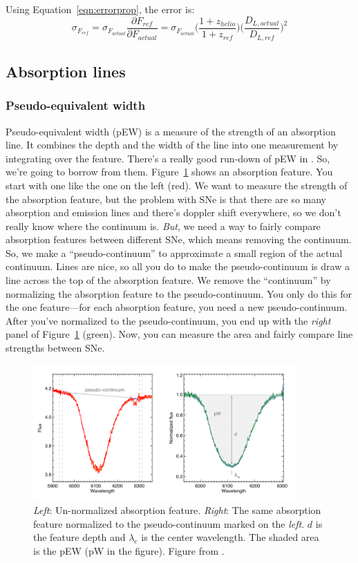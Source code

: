 Using Equation~\ref{eqn:errorprop}, the error is:
\begin{equation}
    \sigma_{F_{ref}} = \sigma_{F_{actual}}\frac{\partial F_{ref}}{\partial F_{actual}} = \sigma_{F_{actual}}\Big( \frac{1 + z_{helio}}{1+z_{ref}} \Big) \Big( \frac{D_{L, actual}}{D_{L, ref}} \Big)^{2}
\end{equation}

\subsection{Absorption lines}
\subsubsection{Pseudo-equivalent width}
Pseudo-equivalent width (pEW) is a measure of the strength of an absorption line. It combines the depth and the width of the line into one measurement by integrating over the feature. There's a really good run-down of pEW in \cite{Galbany2015}. So, we're going to borrow from them. Figure~\ref{fig:pew} shows an absorption feature. You start with one like the one on the left (red). We want to measure the strength of the absorption feature, but the problem with SNe is that there are so many absorption and emission lines and there's doppler shift everywhere, so we don't really know where the continuum is. \textit{But}, we need a way to fairly compare absorption features between different SNe, which means removing the continuum. So, we make a ``pseudo-continuum'' to approximate a small region of the actual continuum. Lines are nice, so all you do to make the pseudo-continuum is draw a line across the top of the absorption feature. We remove the ``continuum'' by normalizing the absorption feature to the pseudo-continuum. You only do this for the one feature---for each absorption feature, you need a new pseudo-continuum. After you've normalized to the pseudo-continuum, you end up with the \textit{right} panel of Figure~\ref{fig:pew} (green). Now, you can measure the area and fairly compare line strengths between SNe. 

\begin{figure}[h!]
    \centering
    \includegraphics[width=0.9\textwidth]{figs/Screenshot from 2022-07-12 16-05-37.png}
    \caption{\textit{Left}: Un-normalized absorption feature. \textit{Right}: The same absorption feature normalized to the pseudo-continuum marked on the \textit{left}. $d$ is the feature depth and $\lambda_{e}$ is the center wavelength. The shaded area is the pEW (pW in the figure). Figure from \cite{Galbany2015}.}
    \label{fig:pew}
\end{figure}

